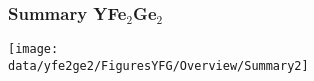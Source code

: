 

%
%
%
%


\begin{frame}[plain,label=YFGSummary]
\frametitle{Summary YFe$_2$Ge$_2$}

\texttt{[image: \\data/yfe2ge2/FiguresYFG/Overview/Summary2]}
%
\end{frame}




